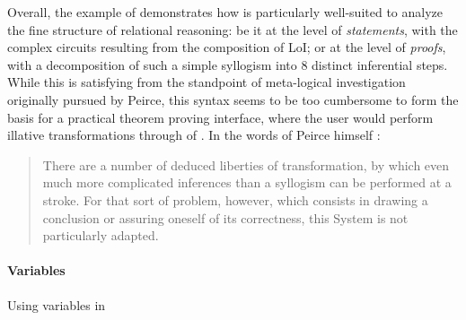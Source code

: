 \begin{scope}
Overall, the example of  demonstrates how 
is particularly well-suited to analyze the fine structure of relational
reasoning: be it at the level of \emph{statements}, with the complex circuits
resulting from the composition of LoI; or at the level of \emph{proofs}, with a
decomposition of such a simple syllogism into 8 distinct inferential steps.
While this is satisfying from the standpoint of meta-logical investigation
originally pursued by Peirce, this syntax seems to be too cumbersome to form the
basis for a practical theorem proving interface, where the user would perform
illative transformations through  of . In the words of
Peirce himself \cite[p.~544]{peirce_prolegomena_1906}:
\begin{quote}
  There are a number of deduced liberties of transformation, by which even much
  more complicated inferences than a syllogism can be performed at a stroke. For
  that sort of problem, however, which consists in drawing a conclusion or
  assuring oneself of its correctness, this System is not particularly adapted.
\end{quote}

\paragraph{Variables}

\begin{marginfigure}
  \hspace{-3em}
  \caption{Using variables in }
\end{marginfigure}


\end{scope}

